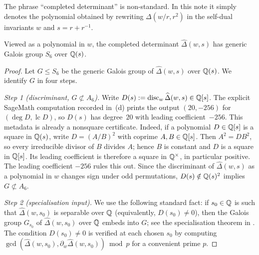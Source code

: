 \begin{remark}
The phrase ``completed determinant'' is non-standard. In this note it
simply denotes the polynomial obtained by rewriting \(\Delta(w/r,r^2)\)
in the self-dual invariants \(w\) and \(s=r+r^{-1}\).
\end{remark}



\begin{proposition}
  \label{prop:sync-hatdelta-galois-s6-generic}
  Viewed as a polynomial in \(w\), the completed determinant
  \(\widehat\Delta(w,s)\) has generic Galois group \(S_6\) over
  \(\mathbb{Q}(s)\).
\end{proposition}

\begin{proof}

Let \(G\le S_6\) be the generic Galois group of
\(\widehat\Delta(w,s)\) over \(\mathbb{Q}(s)\). We identify \(G\) in four
steps.

\medskip
\noindent\textit{Step 1 (discriminant, \(G\not\subset A_6\)).}\quad
Write \(D(s):=\operatorname{disc}_w\widehat\Delta(w,s)\in\mathbb{Q}[s]\). The explicit
SageMath computation recorded in
\,(d) prints the output
\((20,-256)\) for \((\deg D,\operatorname{lc}D)\), so \(D(s)\) has
degree~\(20\) with leading coefficient~\(-256\).
This metadata is already a nonsquare certificate. Indeed, if a
polynomial \(D\in\mathbb{Q}[s]\) is a square in \(\mathbb{Q}(s)\), write
\(D=(A/B)^2\) with coprime \(A,B\in\mathbb{Q}[s]\). Then
\(A^2=DB^2\), so every irreducible divisor of \(B\) divides \(A\);
hence \(B\) is constant and \(D\) is a square in \(\mathbb{Q}[s]\). Its
leading coefficient is therefore a square in \(\mathbb{Q}^\times\), in
particular positive. The leading coefficient \(-256\) rules this out.
Since the discriminant of \(\widehat\Delta(w,s)\) as a polynomial in
\(w\) changes sign under odd permutations,
\(D(s)\notin \mathbb{Q}(s)^2\) implies \(G\not\subset A_6\).

\medskip
\noindent\textit{Step 2 (specialisation input).}\quad
We use the following standard fact: if \(s_0\in\mathbb{Q}\) is such that
\(\widehat\Delta(w,s_0)\) is separable over \(\mathbb{Q}\) (equivalently,
\(D(s_0)\neq 0\)), then the Galois group \(G_{s_0}\) of
\(\widehat\Delta(w,s_0)\) over \(\mathbb{Q}\) embeds into \(G\); see the
specialisation theorem in \cite[\S 4.4, Proposition~1]{Serre2008Topics}.
The condition \(D(s_0)\neq 0\) is
verified at each chosen \(s_0\) by computing
\(\gcd(\widehat\Delta(w,s_0),\partial_w\widehat\Delta(w,s_0))\bmod p\)
for a convenient prime \(p\).


\end{proof}
